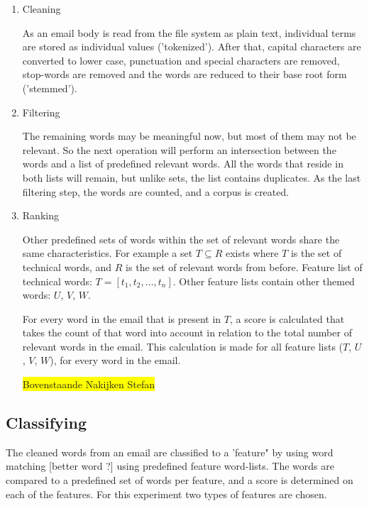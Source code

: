 \documentclass[journal]{IEEEtran}
\begin{document}
\begin{enumerate}
    \item Cleaning

    As an email body is read from the file system as plain text, individual terms are stored as individual values ('tokenized'). After that, capital characters are converted to lower case, punctuation and special characters are removed, stop-words are removed and the words are reduced to their base root form ('stemmed'). 

    \item Filtering

    The remaining words may be meaningful now, but most of them may not be 
    relevant. So the next operation will perform an intersection between the 
    words and a list of predefined relevant words. All the words that reside 
    in both lists will remain, but unlike sets, the list contains duplicates.
    As the last filtering step, the words are counted, and a corpus is created.

    \item Ranking

    Other predefined sets of words within the set of relevant words share the 
    same characteristics. For example a set $T \subseteq R$ exists where $T$ 
    is the set of technical words, and $R$ is the set of relevant words from 
    before. Feature list of technical words: $T = [t_1, t_2, \dots, t_n]$. 
    Other feature lists contain other themed words: $U$, $V$, $W$.

    For every word in the email that is present in $T$, a score is calculated 
    that takes the count of that word into account in relation to the total 
    number of relevant words in the email. This calculation is made for all 
    feature lists ($T$, $U$, $V$, $W$), for every word in the email.

\colorbox{yellow}{Bovenstaande Nakijken Stefan}
    
\end{enumerate}
    
\subsection{Classifying}

    The cleaned words from an email are classified to a 'feature" by using word matching [better word ?] using predefined feature word-lists. The words are compared to a predefined set of words per feature, and a score is determined on each of the features. For this experiment two types of features are chosen. 
    
\end{document}
